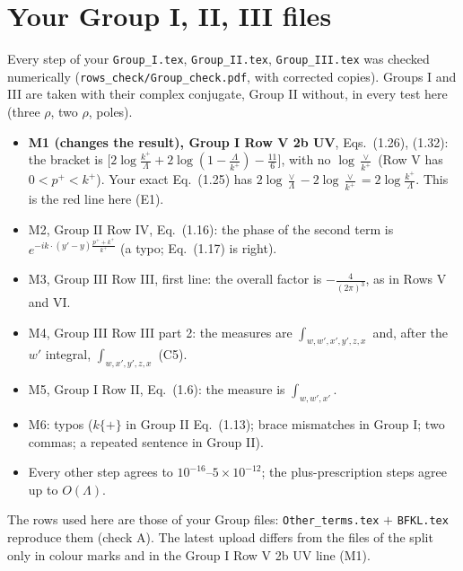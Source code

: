 \documentclass[10pt]{article}
\numberwithin{equation}{section}
\begin{document}
\section{Your Group I, II, III files}\label{sec:groups}
Every step of your \texttt{Group\_I.tex}, \texttt{Group\_II.tex}, \texttt{Group\_III.tex} was checked numerically (\texttt{rows\_check/Group\_check.pdf}, with corrected copies). Groups I and III are taken with their complex conjugate, Group II without, in every test here (three $\rho$, two $\rho$, poles).
\begin{itemize}
\item \textbf{M1 (changes the result), Group I Row V 2b UV}, Eqs.~(1.26), (1.32): the bracket is $\big[2\log\frac{k^+}{\Lambda}+2\log(1-\frac{\Lambda}{k^+})-\frac{11}{6}\big]$, with no $\log\frac{\vee}{k^+}$ (Row V has $0<p^+<k^+$). Your exact Eq.~(1.25) has $2\log\frac{\vee}{\Lambda}-2\log\frac{\vee}{k^+}=2\log\frac{k^+}{\Lambda}$. This is the red line here (E1).
\item M2, Group II Row IV, Eq.~(1.16): the phase of the second term is $e^{-ik\cdot(y'-y)\frac{p^++k^+}{k^+}}$ (a typo; Eq.~(1.17) is right).
\item M3, Group III Row III, first line: the overall factor is $-\frac{4}{(2\pi)^3}$, as in Rows V and VI.
\item M4, Group III Row III part 2: the measures are $\int_{w,w',x',y',z,x}$ and, after the $w'$ integral, $\int_{w,x',y',z,x}$ (C5).
\item M5, Group I Row II, Eq.~(1.6): the measure is $\int_{w,w',x'}$.
\item M6: typos ($k\{+\}$ in Group II Eq.~(1.13); brace mismatches in Group I; two commas; a repeated sentence in Group II).
\item Every other step agrees to $10^{-16}$--$5\times10^{-12}$; the plus-prescription steps agree up to $O(\Lambda)$.
\end{itemize}
The rows used here are those of your Group files: \texttt{Other\_terms.tex} $+$ \texttt{BFKL.tex} reproduce them (check A). The latest upload differs from the files of the split only in colour marks and in the Group I Row V 2b UV line (M1).
\end{document}
